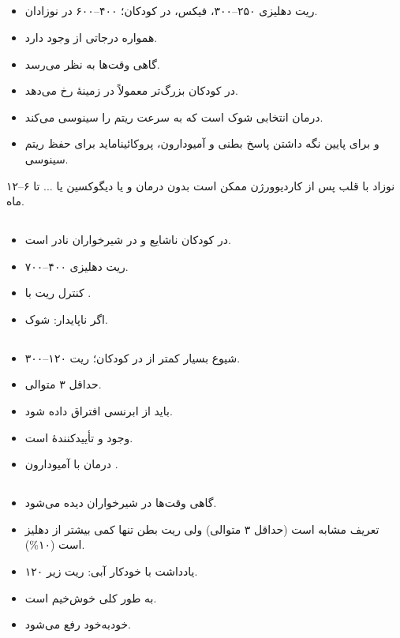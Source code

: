 \documentclass[12pt,a4paper]{article}
\begin{document}
\subsection*{}
\begin{itemize}
\item ریت دهلیزی ۲۵۰–۳۰۰، فیکس، در کودکان؛ ۴۰۰–۶۰۰ در نوزادان.
\item همواره درجاتی از  وجود دارد.
\item گاهی وقت‌ها  به نظر می‌رسد.
\item در کودکان بزرگ‌تر معمولاً در زمینهٔ  رخ می‌دهد.
\item درمان انتخابی شوک  است که به سرعت ریتم را سینوسی می‌کند.
\item {} و  برای پایین نگه داشتن پاسخ بطنی و آمیودارون، پروکائیناماید برای حفظ ریتم سینوسی.
\end{itemize}
نوزاد با قلب  پس از کاردیوورژن ممکن است بدون درمان و یا دیگوکسین یا ... تا ۶–۱۲ ماه.
\subsection*{}
\begin{itemize}
\item در کودکان ناشایع و در شیرخواران نادر است.
\item ریت دهلیزی ۴۰۰–۷۰۰.
\item کنترل ریت با .
\item اگر ناپایدار:  شوک.
\end{itemize}

\subsection*{}
\begin{itemize}
\item شیوع بسیار کمتر از  در کودکان؛ ریت ۱۲۰–۳۰۰.
\item حداقل ۳  متوالی.
\item باید از  ابرنسی افتراق داده شود.
\item وجود  و  تأییدکنندهٔ  است.
\item درمان با آمیودارون .
\end{itemize}
\subsection*{}
\begin{itemize}
\item گاهی وقت‌ها در شیرخواران دیده می‌شود.
\item تعریف مشابه  است (حداقل ۳  متوالی) ولی ریت بطن تنها کمی بیشتر از دهلیز است (۱۰\%).
\item یادداشت با خودکار آبی: ریت زیر ۱۲۰.
\item به طور کلی خوش‌خیم است.
\item خودبه‌خود رفع می‌شود.
\end{itemize}
\end{document}
